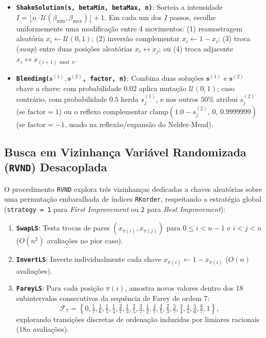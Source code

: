 \documentclass[11pt,a4paper]{article}
\begin{document}
\begin{itemize}[leftmargin=*]
  \item \textbf{\texttt{ShakeSolution(s, betaMin, betaMax, n)}}: Sorteia a intensidade $I = \lfloor n \cdot \mathcal{U}(\beta_{\min}, \beta_{\max}) \rfloor + 1$. Em cada um dos $I$ passos, escolhe uniformemente uma modificação entre 4 movimentos: (1) reamostragem aleatória $x_i \leftarrow \mathcal{U}(0,1)$; (2) inversão complementar $x_i \leftarrow 1 - x_i$; (3) troca (\emph{swap}) entre duas posições aleatórias $x_i \leftrightarrow x_j$; ou (4) troca adjacente $x_i \leftrightarrow x_{(i+1) \bmod n}$.
  \item \textbf{\texttt{Blending($\mathbf{s}^{(1)}, \mathbf{s}^{(2)}$, factor, n)}}: Combina duas soluções $\mathbf{s}^{(1)}$ e $\mathbf{s}^{(2)}$ chave a chave: com probabilidade $0.02$ aplica mutação $\mathcal{U}(0,1)$; caso contrário, com probabilidade $0.5$ herda $s^{(1)}_j$, e nos outros $50\%$ atribui $s^{(2)}_j$ (se $\text{factor} = 1$) ou o reflexo complementar $\text{clamp}(1.0 - s^{(2)}_j,\, 0,\, 0.9999999)$ (se $\text{factor} = -1$, usado na reflexão/expansão do Nelder-Mead).
\end{itemize}

\subsection{Busca em Vizinhança Variável Randomizada (\texttt{RVND}) Desacoplada}

O procedimento \texttt{RVND} explora três vizinhanças dedicadas a chaves aleatórias sobre uma permutação embaralhada de índices \texttt{RKorder}, respeitando a estratégia global (\texttt{strategy = 1} para \emph{First Improvement} ou \texttt{2} para \emph{Best Improvement}):
\begin{enumerate}[leftmargin=*]
  \item \textbf{\texttt{SwapLS}}: Testa trocas de pares $(x_{\pi(i)}, x_{\pi(j)})$ para $0 \le i < n-1$ e $i < j < n$ ($O(n^2)$ avaliações no pior caso).
  \item \textbf{\texttt{InvertLS}}: Inverte individualmente cada chave $x_{\pi(i)} \leftarrow 1 - x_{\pi(i)}$ ($O(n)$ avaliações).
  \item \textbf{\texttt{FareyLS}}: Para cada posição $\pi(i)$, amostra novos valores dentro dos 18 subintervalos consecutivos da sequência de Farey de ordem 7:
  \[
    \mathcal{F}_7 = \left\{0, \tfrac{1}{7}, \tfrac{1}{6}, \tfrac{1}{5}, \tfrac{1}{4}, \tfrac{2}{7}, \tfrac{1}{3}, \tfrac{2}{5}, \tfrac{3}{7}, \tfrac{1}{2}, \tfrac{4}{7}, \tfrac{3}{5}, \tfrac{2}{3}, \tfrac{5}{7}, \tfrac{3}{4}, \tfrac{4}{5}, \tfrac{5}{6}, \tfrac{6}{7}, 1\right\},
  \]
  explorando transições discretas de ordenação induzidas por limiares racionais ($18n$ avaliações).
\end{enumerate}
\end{document}
